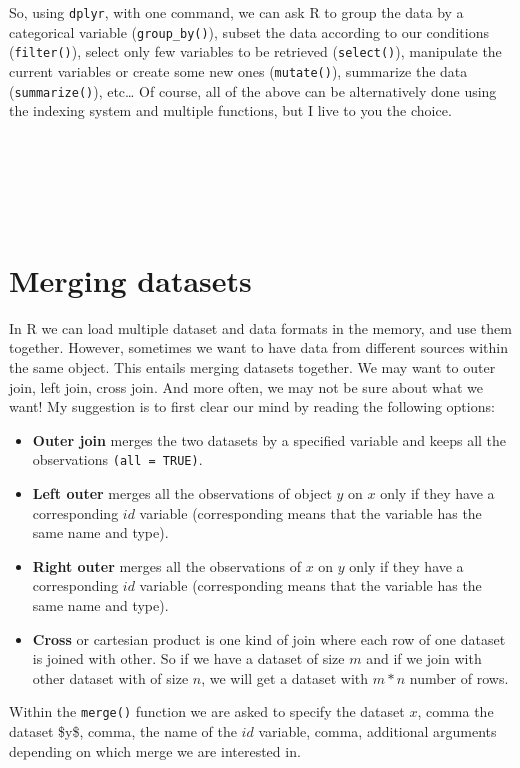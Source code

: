 \documentclass[
]{svmono}
\begin{document}
So, using \texttt{dplyr}, with one command, we can ask R to group the data by a
categorical variable (\texttt{group\_by()}), subset the data according to our
conditions (\texttt{filter()}), select only few variables to be retrieved
(\texttt{select()}), manipulate the current variables or create some new ones
(\texttt{mutate()}), summarize the data (\texttt{summarize()}), etc\ldots{} Of course, all
of the above can be alternatively done using the indexing system and
multiple functions, but I live to you the choice.

~

~

~

\hypertarget{merging-datasets}{%
\section{Merging datasets}\label{merging-datasets}}

In R we can load multiple dataset and data formats in the memory, and
use them together. However, sometimes we want to have data from
different sources within the same object. This entails merging datasets
together. We may want to outer join, left join, cross join. And more
often, we may not be sure about what we want! My suggestion is to first
clear our mind by reading the following options:

\begin{itemize}
\item
  \textbf{Outer join} merges the two datasets by a specified variable and
  keeps all the observations \texttt{(all\ =\ TRUE)}.
\item
  \textbf{Left outer} merges all the observations of object \(y\) on \(x\) only
  if they have a corresponding \(id\) variable (corresponding means that
  the variable has the same name and type).
\item
  \textbf{Right outer} merges all the observations of \(x\) on \(y\) only if
  they have a corresponding \(id\) variable (corresponding means that
  the variable has the same name and type).
\item
  \textbf{Cross} or cartesian product is one kind of join where each row of
  one dataset is joined with other. So if we have a dataset of size
  \(m\) and if we join with other dataset with of size \(n\), we will get
  a dataset with \(m*n\) number of rows.
\end{itemize}

Within the \texttt{merge()} function we are asked to specify the dataset \(x\),
comma the dataset \$y\$, comma, the name of the \(id\) variable, comma,
additional arguments depending on which merge we are interested in.
\end{document}

